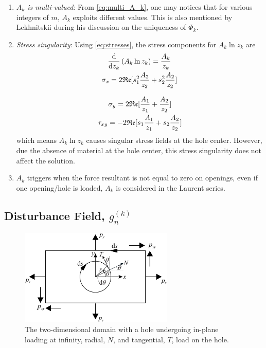 \documentclass{article}
\begin{document}
\begin{enumerate}
    \item \textit{$A_k$ is multi-valued}: From \cref{eq:multi_A_k}, one may notices that for various integers of $m$, $A_k$ exploits different values. This is also mentioned by Lekhnitskii \cite{Lekhnitskii1968} during his discussion on the uniqueness of $\Phi_k$.
    \item \textit{Stress singularity}: Using \cref{eq:stresses}, the stress components for $A_k \ln z_k$ are
        \begin{gather*}
        \dfrac{\mathrm{d}}{\mathrm{d}z_k}\left( A_k \ln z_k \right) = \dfrac{A_k}{z_k} \notag \\
        \sigma_x = 2 \mathfrak{Re}[s_1^2 \dfrac{A_2}{z_2} + s_2^2 \dfrac{A_2}{z_2}]  \notag \\
    \end{gather*}
    
    \begin{gather*}
        \sigma_y = 2 \mathfrak{Re}[\dfrac{A_1}{z_1} + \dfrac{A_2}{z_2}]  \notag \\
        \tau_{xy} = -2 \mathfrak{Re}[s_1 \dfrac{A_1}{z_1} + s_2 \dfrac{A_2}{z_2}] 
    \end{gather*}
    which means $A_k \ln z_k$ causes singular stress fields at the hole center. However, due the absence of material at the hole center, this stress singularity does not affect the solution.
    \item $A_k$ triggers when the force resultant is not equal to zero on openings, even if one opening/hole is loaded, $A_k$ is considered in the Laurent series.
\end{enumerate}

\subsection{Disturbance Field, \texorpdfstring{$g_n^{(k)}$}{}}\label{sec:g_k}

\begin{figure}[H]
    \centering
    \includegraphics[width = 0.65\textwidth ]{figures/g_k.pdf}
    \caption{The two-dimensional domain with a hole undergoing in-plane loading at infinity, radial, $N$, and tangential, $T$, load on the hole.}
    \label{fig:domain_g_k}
\end{figure}
\end{document}
